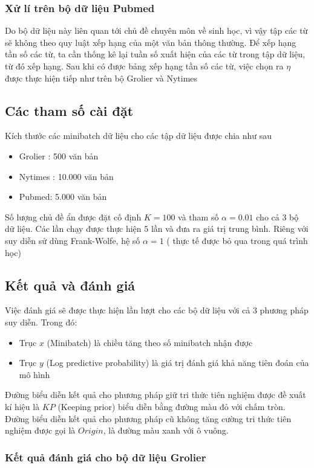 \documentclass[fontsize=13pt]{scrartcl}
\begin{document}
\subsubsection{Xử lí trên bộ dữ liệu Pubmed}
Do bộ dữ liệu này liên quan tới chủ đề chuyên môn về sinh học, vì vậy tập các từ sẽ không theo quy luật xếp hạng của một văn bản thông thường. Để xếp hạng tần số các từ, ta cần thống kê lại tuần số xuất hiện của các từ trong tập dữ liệu, từ đó xếp hạng.
Sau khi có được bảng xếp hạng tần số các từ, việc chọn ra $\eta$ được thực hiện tiếp như trên bộ Grolier và Nytimes
\subsection{Các tham số cài đặt}
Kích thước các minibatch dữ liệu cho các tập dữ liệu được chia như sau
\begin{itemize}
\item Grolier : 500 văn bản
\item Nytimes : 10.000 văn bản
\item Pubmed: 5.000 văn bản
\end{itemize}
Số lượng chủ đề ẩn được đặt cố định $K = 100$ và tham số $\alpha = 0.01$  cho cả 3 bộ dữ liệu. Các lần chạy được thực hiện 5 lần và đưa ra giá trị trung bình. Riêng với suy diễn sử dùng Frank-Wolfe, hệ số $\alpha = 1$ ( thực tế được bỏ qua trong quá trình học)
\subsection{Kết quả và đánh giá}
Việc đánh giá sẽ được thực hiện lần lượt cho các bộ dữ liệu với cả 3 phương pháp suy diễn. Trong đó:
\begin{itemize}
\item Trục $x$ (Minibatch) là chiều tăng theo số minibatch nhận được
\item Trục $y$ (Log predictive probability) là giá trị đánh giá khả năng tiên đoán của mô hình
\end{itemize}
Đường biểu diễn kết quả cho phương pháp giữ tri thức tiên nghiệm được đề xuất kí hiệu là $KP$ (Keeping prior) biểu diễn bằng đường màu đỏ với chấm tròn. Đường biểu diễn kết quả cho phương pháp cũ không tăng cường tri thức tiên nghiệm được gọi là $Origin$, là đường màu xanh với ô vuông.
\subsubsection{Kết quả đánh giá cho bộ dữ liệu Grolier}
\end{document}
